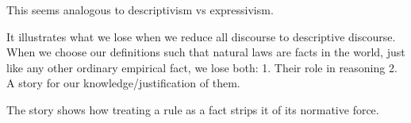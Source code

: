 
This seems analogous to descriptivism vs expressivism.

It illustrates what we lose when we reduce all discourse to descriptive discourse. When we choose our definitions such that natural laws are facts in the world, just like any other ordinary empirical fact, we lose both:
1. Their role in reasoning
2. A story for our knowledge/justification of them.

The story shows how treating a rule as a fact strips it of its normative force.